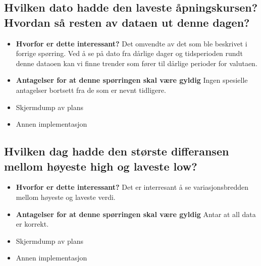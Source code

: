 \documentclass{article}
\begin{document}
    \subsection{Hvilken dato hadde den laveste åpningskursen? Hvordan så resten av dataen ut denne dagen?}
    \begin{itemize}
        
    \item \textbf{Hvorfor er dette interessant?} \newline
    Det omvendte av det som ble beskrivet i forrige spørring. Ved å se på dato fra dårlige dager og tidsperioden rundt denne dataoen kan vi finne trender som fører til dårlige perioder for valutaen.
    \item \textbf{Antagelser for at denne spørringen skal være gyldig} \newline
    Ingen spesielle antagelser bortsett fra de som er nevnt tidligere.
    \item Skjermdump av plans
    
    \item Annen implementasjon

    \end{itemize}

    \subsection{Hvilken dag hadde den største differansen mellom høyeste high og laveste low?}
    \begin{itemize}
        
    \item \textbf{Hvorfor er dette interessant?} \newline
    Det er interresant å se variasjonsbredden mellom høyeste og laveste verdi.
    \item \textbf{Antagelser for at denne spørringen skal være gyldig} \newline
    Antar at all data er korrekt.
    \item Skjermdump av plans
    
    \item Annen implementasjon

    \end{itemize}
\end{document}

